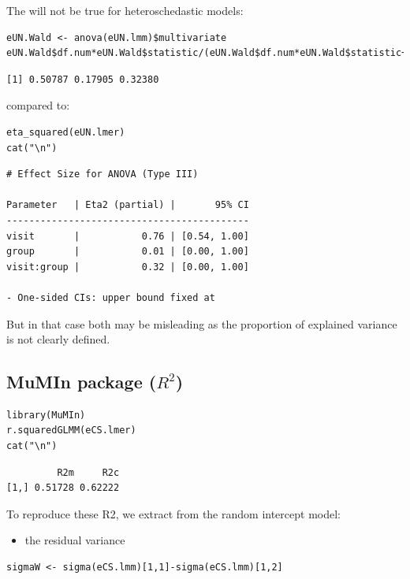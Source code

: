 \documentclass[12pt]{article}
\begin{document}
The will not be true for heteroschedastic models:
\lstset{language=r,label= ,caption= ,captionpos=b,numbers=none}
\begin{lstlisting}
eUN.Wald <- anova(eUN.lmm)$multivariate
eUN.Wald$df.num*eUN.Wald$statistic/(eUN.Wald$df.num*eUN.Wald$statistic+eUN.Wald$df.denom)
\end{lstlisting}

\begin{verbatim}
[1] 0.50787 0.17905 0.32380
\end{verbatim}


compared to:
\lstset{language=r,label= ,caption= ,captionpos=b,numbers=none}
\begin{lstlisting}
eta_squared(eUN.lmer)
cat("\n")
\end{lstlisting}

\begin{verbatim}
# Effect Size for ANOVA (Type III)

Parameter   | Eta2 (partial) |       95% CI
-------------------------------------------
visit       |           0.76 | [0.54, 1.00]
group       |           0.01 | [0.00, 1.00]
visit:group |           0.32 | [0.00, 1.00]

- One-sided CIs: upper bound fixed at
\end{verbatim}


But in that case both may be misleading as the proportion of explained
variance is not clearly defined.

\subsection{MuMIn package (\(R^2\))}
\label{sec:org69c173e}

\lstset{language=r,label= ,caption= ,captionpos=b,numbers=none}
\begin{lstlisting}
library(MuMIn)
r.squaredGLMM(eCS.lmer)
cat("\n")
\end{lstlisting}

\begin{verbatim}
         R2m     R2c
[1,] 0.51728 0.62222
\end{verbatim}


To reproduce these R2, we extract from the random intercept model:
\begin{itemize}
\item the residual variance
\end{itemize}
\lstset{language=r,label= ,caption= ,captionpos=b,numbers=none}
\begin{lstlisting}
sigmaW <- sigma(eCS.lmm)[1,1]-sigma(eCS.lmm)[1,2]
\end{lstlisting}
\end{document}
